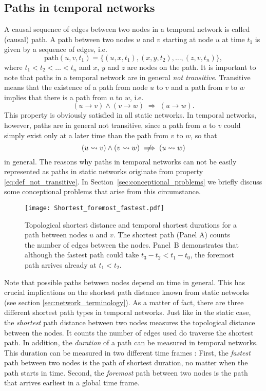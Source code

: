\subsection{Paths in temporal networks}\label{sec:paths_in_temporal_networks}
A causal sequence of edges between two nodes in a temporal network is called (causal) path.
A path between two nodes $u$ and $v$ starting at node $u$ at time $t_1$ is given by a sequence of edges, i.e.
\[
\mathrm{path}(u,v,t_1)= \{ (u,x,t_1),(x,y,t_2),\dots ,(z,v,t_n) \}, 
\]
where $ t_1<t_2<\dots <t_n$ and $x$, $y$ and $z$ are nodes on the path.
It is important to note that paths in a temporal network are in general \emph{not transitive}.
Transitive means that the existence of a path from node $u$ to $v$ and a path from $v$ to $w$ implies that there is a path from $u$ to $w$, i.e.
\begin{equation}\label{eq:def_transitive}
(u\rightarrow v) \wedge (v\rightarrow w) \; \Longrightarrow \; (u\rightarrow w).
\end{equation}
This property is obviously satisfied in all static networks.
In temporal networks, however, paths are in general not transitive, since a path from $u$ to $v$ could simply exist only at a later time than the path from $v$ to $w$, so that
\begin{equation}\label{eq:def_not_transitive}
(u\rightsquigarrow v) \wedge (v\rightsquigarrow w) \;\centernot \Longrightarrow \; (u\rightsquigarrow w)
\end{equation}
in general.
The reasons why paths in temporal networks can not be easily represented as paths in static networks originate from property \eqref{eq:def_not_transitive}.
In Section~\ref{sec:conceptional_problems} we briefly discuss some conceptional problems that arise from this circumstance.

\begin{SCfigure}
\texttt{[image: Shortest\_foremost\_fastest.pdf]}
\caption{Topological shortest distance and temporal shortest durations for a path between nodes $u$ and $v$.
The shortest path (Panel A) counts the number of edges between the nodes.
Panel~B demonstrates that although the fastest path could take $t_3-t_2 < t_1-t_0$, the foremost path arrives already at $t_1<t_2$.
}
\label{fig:shortest_foremost_fastest}
\end{SCfigure}
%
Note that possible paths between nodes depend on time in general.
This has crucial implications on the shortest path distance known from static networks (see section  \ref{sec:network_terminology}).
As a matter of fact, there are three different shortest path types in temporal networks.
Just like in the static case, the \emph{shortest} path distance between two nodes measures the topological distance between the nodes.
It counts the number of edges used do traverse the shortest path.
In addition, the \emph{duration} of a path can be measured in temporal networks.
This duration can be measured in two different time frames \citep{Casteights_review}:
First, the \emph{fastest} path between two nodes is the path of shortest duration, no matter when the path starts in time.
Second, the \emph{foremost} path between two nodes is the path that arrives earliest in a global time frame.


